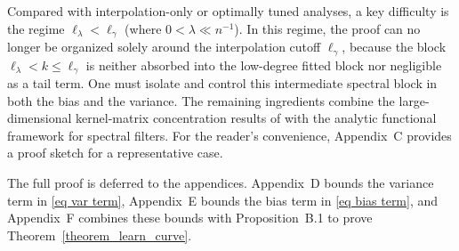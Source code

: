 \documentclass{article}
\theoremstyle{plain}
\theoremstyle{definition}
\theoremstyle{remark}
\begin{document}
Compared with interpolation-only or optimally tuned analyses, a key difficulty is the regime $\ell_\lambda < \ell_\gamma$ (where $0<\lambda \ll n^{-1}$). 
In this regime, the proof can no longer be organized solely around the interpolation cutoff $\ell_\gamma$, because the block $\ell_\lambda < k \le \ell_\gamma$ is neither absorbed into the low-degree fitted block nor negligible as a tail term. 
One must isolate and control this intermediate spectral block in both the bias and the variance. 
The remaining ingredients combine the large-dimensional kernel-matrix concentration results of \cite{ghorbani2021linearized} with the analytic functional framework for spectral filters. For the reader's convenience, Appendix~C provides a proof sketch for a representative case.

The full proof is deferred to the appendices. Appendix~D bounds the variance term in \eqref{eq var term}, Appendix~E bounds the bias term in \eqref{eq bias term}, and Appendix~F combines these bounds with Proposition~B.1 to prove Theorem~\ref{theorem_learn_curve}.











\end{document}
